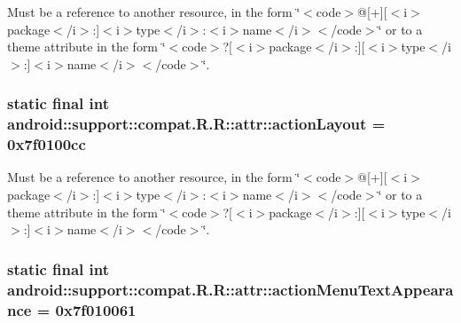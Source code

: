 Must be a reference to another resource, in the form \char`\"{}$<$code$>$@\mbox{[}+\mbox{]}\mbox{[}$<$i$>$package$<$/i$>$:\mbox{]}$<$i$>$type$<$/i$>$:$<$i$>$name$<$/i$>$$<$/code$>$\char`\"{} or to a theme attribute in the form \char`\"{}$<$code$>$?\mbox{[}$<$i$>$package$<$/i$>$:\mbox{]}\mbox{[}$<$i$>$type$<$/i$>$:\mbox{]}$<$i$>$name$<$/i$>$$<$/code$>$\char`\"{}. \hypertarget{classandroid_1_1support_1_1compat_1_1_r_1_1attr_2b17207ab30cc9f2f7abf775fc987ee9}{
\subsubsection[{actionLayout}]{\setlength{\rightskip}{0pt plus 5cm}static final int android::support::compat.R.R::attr::actionLayout = 0x7f0100cc}}
\label{classandroid_1_1support_1_1compat_1_1_r_1_1attr_2b17207ab30cc9f2f7abf775fc987ee9}


Must be a reference to another resource, in the form \char`\"{}$<$code$>$@\mbox{[}+\mbox{]}\mbox{[}$<$i$>$package$<$/i$>$:\mbox{]}$<$i$>$type$<$/i$>$:$<$i$>$name$<$/i$>$$<$/code$>$\char`\"{} or to a theme attribute in the form \char`\"{}$<$code$>$?\mbox{[}$<$i$>$package$<$/i$>$:\mbox{]}\mbox{[}$<$i$>$type$<$/i$>$:\mbox{]}$<$i$>$name$<$/i$>$$<$/code$>$\char`\"{}. \hypertarget{classandroid_1_1support_1_1compat_1_1_r_1_1attr_00d332eb712e0560392ca1e735e52419}{
\subsubsection[{actionMenuTextAppearance}]{\setlength{\rightskip}{0pt plus 5cm}static final int android::support::compat.R.R::attr::actionMenuTextAppearance = 0x7f010061}}
\label{classandroid_1_1support_1_1compat_1_1_r_1_1attr_00d332eb712e0560392ca1e735e52419}


